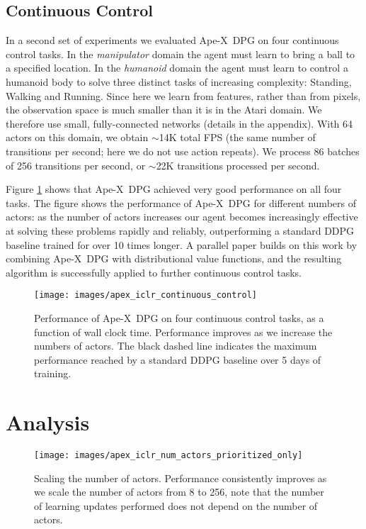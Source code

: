 \documentclass{article} \PassOptionsToPackage{usenames,dvipsnames}{xcolor}
\def\apex{Ape-X}
\def\smallcaption#1{\caption{\small #1}\vspace{-0.4cm}}
\begin{document}
\subsection{Continuous Control}

In a second set of experiments we evaluated \apex\ DPG on four continuous control tasks. In the \emph{manipulator} domain the agent must learn to bring a ball to a specified location. In the \emph{humanoid} domain the agent must learn to control a humanoid body to solve three distinct tasks of increasing complexity: Standing, Walking and Running. Since here we learn from features, rather than from pixels, the observation space is much smaller than it is in the Atari domain. We therefore use small, fully-connected networks (details in the appendix). With 64 actors on this domain, we obtain $\sim$14K total FPS (the same number of transitions per second; here we do not use action repeats). We process 86 batches of 256 transitions per second, or $\sim$22K transitions processed per second. 

Figure \ref{fig:continuous_control} shows that \apex\ DPG achieved very good performance on all four tasks. The figure shows the performance of \apex\ DPG for different numbers of actors: as the number of actors increases our agent becomes increasingly effective at solving these problems rapidly and reliably, outperforming a standard DDPG baseline trained for over 10 times longer. A parallel paper \citep{d4pg} builds on this work by combining \apex\ DPG with distributional value functions, and the resulting algorithm is successfully applied to further continuous control tasks. 

\begin{figure}[t]
    \centering
    \texttt{[image: images/apex\_iclr\_continuous\_control]}
    \smallcaption{Performance of \apex\ DPG on four continuous control tasks, as a function of wall clock time. Performance improves as we increase the numbers of actors. The black dashed line indicates the maximum performance reached by a standard DDPG baseline over 5 days of training.}
    \label{fig:continuous_control}
\end{figure}

\section{Analysis}

\begin{figure}
    \centering
    \texttt{[image: images/apex\_iclr\_num\_actors\_prioritized\_only]}
    \smallcaption{Scaling the number of actors. Performance consistently improves as we scale the number of actors from 8 to 256, note that the number of learning updates performed does not depend on the number of actors.}
    \label{fig:num_actors_prioritized_only}
\end{figure}
\end{document}
